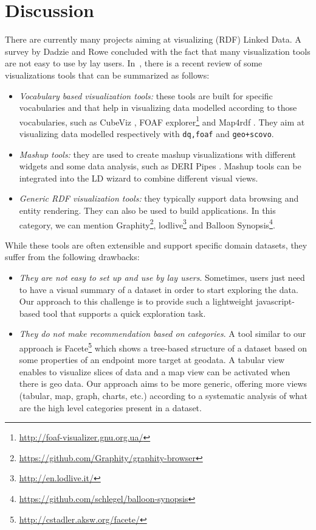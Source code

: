 \section{Discussion}
\label{sec:discussion}
There are currently many projects aiming at visualizing (RDF) Linked Data. A survey by Dadzie and Rowe \cite{Dadzie:2011} concluded with the fact that many visualization tools are not easy to use by lay users. In~\cite{Klimek2014}, there is a recent review of some visualizations tools that can be summarized as follows:
\begin{itemize}
 \item \textit{Vocabulary based visualization tools:} these tools are built for specific vocabularies and that help in visualizing data modelled according to those vocabularies, such as CubeViz \cite{cubeviz:2012}, FOAF explorer\footnote{\url{http://foaf-visualizer.gnu.org.ua/}} and Map4rdf \cite{leon2012}. They aim at visualizing data modelled respectively with \texttt{dq,foaf} and \texttt{geo+scovo}.
 \item \textit{Mashup tools:} they are used to create mashup visualizations with different widgets and some data analysis, such as DERI Pipes \cite{danh2009}. Mashup tools can be integrated into the LD wizard to combine different visual views.  
 \item \textit{Generic RDF visualization tools:} they typically support data browsing and entity rendering. They can also be used to build applications. In this category, we can mention Graphity\footnote{\url{https://github.com/Graphity/graphity-browser}}, lodlive\footnote{\url{http://en.lodlive.it/}} and Balloon Synopsis\footnote{\url{https://github.com/schlegel/balloon-synopsis}}.
\end{itemize}
While these tools are often extensible and support specific domain datasets, they suffer from the following drawbacks:
\begin{itemize}
 \item \textit{They are not easy to set up and use by lay users}. Sometimes, users just need to have a visual summary of a dataset in order to start exploring the data. Our approach to this challenge is to provide such a lightweight javascript-based tool that supports a quick exploration task.
 \item \textit{They do not make recommendation based on categories}. A tool similar to our approach is Facete\footnote{\url{http://cstadler.aksw.org/facete/}}\cite{facete:2014} which shows a tree-based structure of a dataset based on some properties of an endpoint more target at geodata. A tabular view enables to visualize slices of data and a map view can be activated when there is geo data. Our approach aims to be more generic, offering more views (tabular, map, graph, charts, etc.) according to a systematic analysis of what are the high level categories present in a dataset.
\end{itemize}

